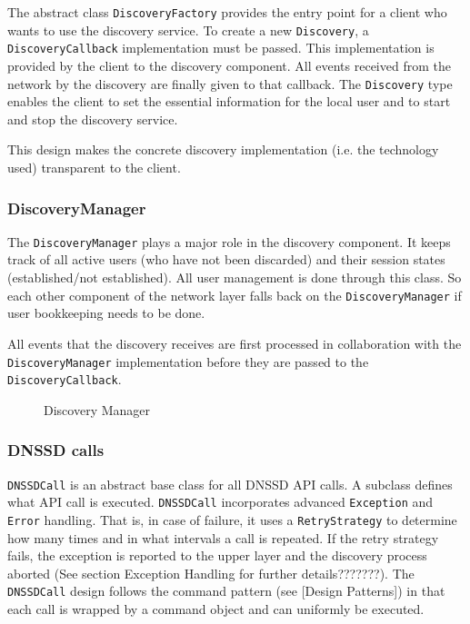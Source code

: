 The abstract class  \texttt{DiscoveryFactory} provides the entry point for a client who wants to use the discovery service. To create a new  \texttt{Discovery}, a  \texttt{DiscoveryCallback} implementation must be passed. This implementation is provided by the client to the discovery component. All events received from the network by the discovery are finally given to that callback. The  \texttt{Discovery} type enables the client to set the  essential information for the local user and to start and stop the discovery service.

This design makes the concrete discovery implementation (i.e. the technology used) transparent to the client.


\subsubsection{DiscoveryManager}
The  \texttt{DiscoveryManager} plays a major role in the discovery component. It keeps track of all active users (who have not been discarded) and their session states (established/not established). All user management is done through this class. So each other component of the network layer falls back on the  \texttt{DiscoveryManager} if user bookkeeping needs to be done.

All events that the discovery receives are first processed in collaboration with the \texttt{DiscoveryManager} implementation before they are passed to the  \texttt{DiscoveryCallback}.

\begin{figure}[H]
 \centering
 \caption{Discovery Manager}
 \label{fig:network.discovery.manager}
\end{figure}


\subsubsection{DNSSD calls}
\texttt{DNSSDCall} is an abstract base class for all DNSSD API calls. A subclass defines what API call is executed. \texttt{DNSSDCall} incorporates advanced \texttt{Exception} and \texttt{Error} handling. That is, in case of failure, it uses a \texttt{RetryStrategy} to determine how many times and in what intervals a call is repeated. If the retry strategy fails, the exception is reported to the upper layer and the discovery process aborted (See section Exception Handling for further details???????). The \texttt{DNSSDCall} design follows the command pattern (see [Design Patterns]) in that each call is wrapped by a command object and can uniformly be executed.

